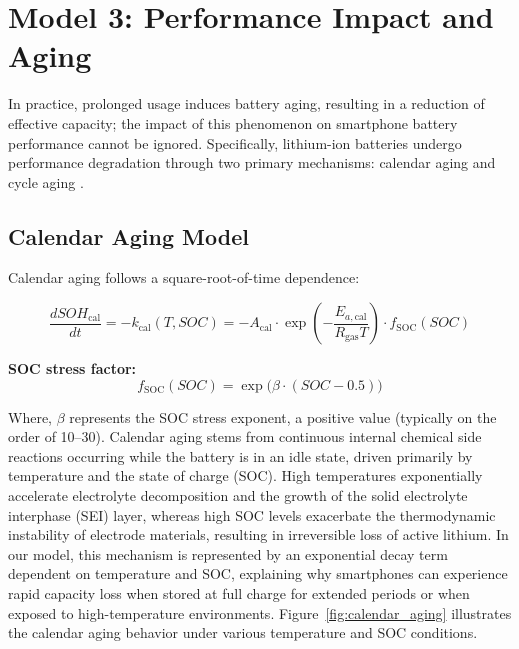 \section{Model 3: Performance Impact and Aging}
\label{sec:model3}

\hspace*{\parindent}In practice, prolonged usage induces battery aging, resulting in a reduction of effective capacity; the impact of this phenomenon on smartphone battery performance cannot be ignored. Specifically, lithium-ion batteries undergo performance degradation through two primary mechanisms: calendar aging and cycle aging \cite{Bloom2001, Wang2014, Barr2013}.


\subsection{Calendar Aging Model}
\label{subsec:calendar_aging}

\hspace*{\parindent}Calendar aging follows a square-root-of-time dependence:

\begin{equation}
    \frac{dSOH_{\text{cal}}}{dt} = -k_{\text{cal}}(T, SOC) = -A_{\text{cal}} \cdot \exp\left(-\frac{E_{a,\text{cal}}}{R_{\text{gas}} T}\right) \cdot f_{\text{SOC}}(SOC)
    \label{eq:calendar_aging}
\end{equation}

\textbf{SOC stress factor:}
\begin{equation}
    f_{\text{SOC}}(SOC) = \exp\bigl(\beta \cdot (SOC - 0.5)\bigr)
\end{equation}

\hspace*{\parindent}Where, $\beta$ represents the SOC stress exponent, a positive value (typically on the order of 10--30). Calendar aging stems from continuous internal chemical side reactions occurring while the battery is in an idle state, driven primarily by temperature and the state of charge (SOC). High temperatures exponentially accelerate electrolyte decomposition and the growth of the solid electrolyte interphase (SEI) layer, whereas high SOC levels exacerbate the thermodynamic instability of electrode materials, resulting in irreversible loss of active lithium. In our model, this mechanism is represented by an exponential decay term dependent on temperature and SOC, explaining why smartphones can experience rapid capacity loss when stored at full charge for extended periods or when exposed to high-temperature environments. Figure~\ref{fig:calendar_aging} illustrates the calendar aging behavior under various temperature and SOC conditions.

